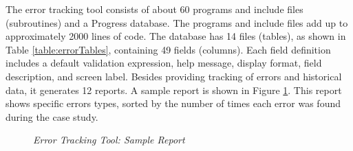 The error tracking tool consists of about 60 programs and include files
(subroutines) and a Progress database. The programs and include files add
up to approximately 2000 lines of code. The database has 14 files (tables),
as shown in Table \ref{table:errorTables}, containing 49 fields (columns).
Each field definition includes a default validation expression, help
message, display format, field description, and screen label.  Besides
providing tracking of errors and historical data, it generates 12 reports.
A sample report is shown in Figure \ref{fig:toolSample4}.  This report
shows specific errors types, sorted by the number of times each error was
found during the case study.

\begin{figure} [htb]
    {\centerline{}}
    \caption[Error Tracking Tool: Sample Report]{\label{fig:toolSample4}
    {\em Error Tracking Tool: Sample Report}}
\end{figure}

